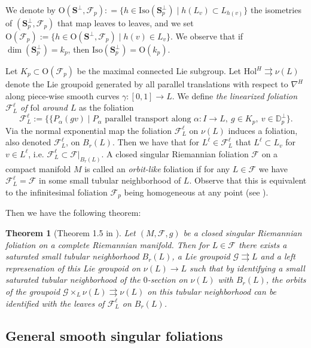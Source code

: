 \documentclass[12pt,a4paper,reqno]{amsart}
\newcommand{\1}{\mathbbm{1}} %
\newcommand{\D}{\mathbb{D}} %
\newcommand{\fol}{\mathcal{F}} %
\newcommand{\Sp}{\mathbf{S}} %
\newtheorem{thm}{Theorem}[section]
\theoremstyle{definition}
\theoremstyle{TheoremNum}
\begin{document}
We denote by $\mathrm{O}(\Sp^\perp,\fol_p): = \{h\in \mathrm{Iso}(\Sp^\perp_p)\mid h(L_v)\subset L_{h(v)}\}$ the isometries of $(\Sp^\perp_p,\fol_p)$ that map leaves to leaves, and we set $\mathrm{O}(\fol_p):= \{h\in \mathrm{O}(\Sp^\perp,\fol_p)\mid h(v)\in L_v\}$. We observe that if $\dim(\Sp^\perp_p) = k_p$, then $\mathrm{Iso}(\Sp^\perp_p)=\mathrm{O}(k_p)$.

Let $K_p\subset \mathrm{O}(\fol_p)$ be the maximal connected Lie subgroup. Let $\mathrm{Hol}^H\rightrightarrows \nu(L)$ denote the Lie groupoid generated by all parallel translations with respect to $\nabla^H$ along piece-wise smooth curves $\gamma\colon [0,1]\to L$. We define \emph{the linearized foliation $\mathcal{F}^\ell_L$ of $\mathrm{fol}$ around $L$} as the foliation
\[
\mathcal{F}^\ell_L := \{\{P_\alpha(gv)\mid P_\alpha\mbox{ parallel transport along }\alpha\colon I\to L,\: g\in K_p,\: v\in \D^\perp_p\}.
\]
Via the normal exponential map the foliation $\mathcal{F}^\ell_L$ on $\nu(L)$ induces a foliation, also denoted $\mathcal{F}^\ell_L$, on $B_r(L)$. Then we have that for $L^\ell\in \fol^\ell_L$ that $L^\ell\subset L_v$ for $v\in L^\ell$, i.e. $\fol^\ell_L\subset \fol|_{B_r(L)}$. A closed singular Riemannian foliation $\fol$ on a compact manifold $M$ is called an \emph{orbit-like} foliation if for any $L\in \fol$ we have $\fol^\ell_L= \fol$ in some small tubular neighborhood of $L$. Observe that this is equivalent to the infinitesimal foliation $\fol_p$ being homogeneous at any point (see \cite{AlexandrinoRadeschi2016}). 

Then we have the following theorem: 

\begin{thm}[Theorem 1.5 in \cite{AlexandrinoInagakiStruchiner2018}]\th\label{T: Local transversal homogeneous subfoliation}
Let $(M,\fol,g)$ be a closed singular Riemannian foliation on a complete Riemannian manifold. Then for $L\in \fol$ there exists a saturated small tubular neighborhood $B_r(L)$, a Lie groupoid $\mathcal{G}\rightrightarrows L$ and a left represenation of this Lie groupoid on $\nu(L)\to L$ such that by identifying a small saturated tubular neighborhood of the $0$-section on $\nu(L)$ with $B_r(L)$, the orbits of the groupoid $\mathcal{G}\times_L \nu(L)\rightrightarrows \nu(L)$ on this tubular neighborhood can be identified with the leaves of $\fol^\ell_L$ on $B_r(L)$.
\end{thm}


\subsection{General smooth singular foliations}
\end{document}

